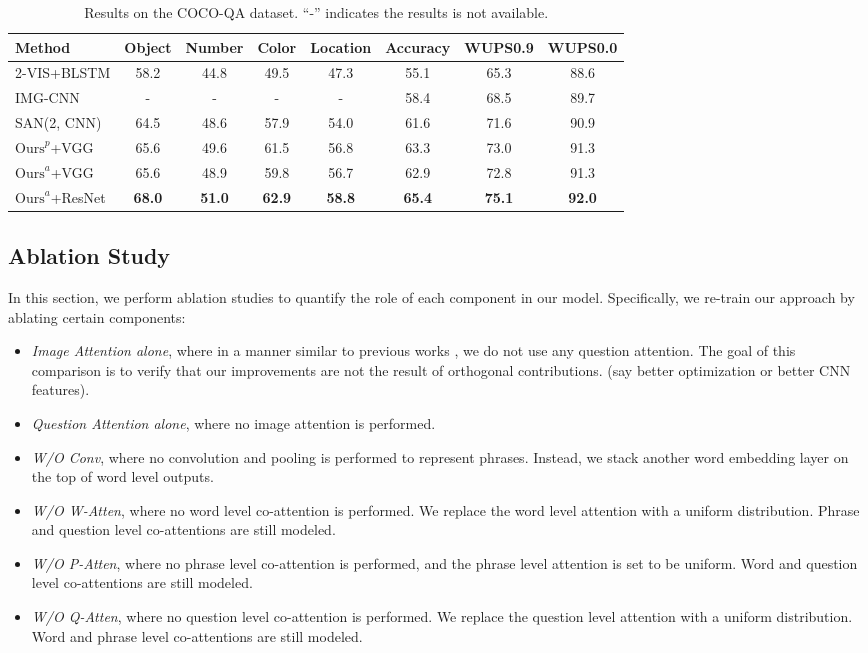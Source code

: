 \documentclass{article}
\begin{document}
\begin{table}[t]\footnotesize
\setlength{\tabcolsep}{5.5pt}
  \caption{Results on the COCO-QA dataset. ``-'' indicates the results is not available.} \label{tab:cocoqa}
  \centering
  \begin{tabular}{l c c c c c c c}
    \toprule
    Method  & Object & Number & Color & Location & Accuracy & WUPS0.9 & WUPS0.0 \\
    \midrule	    
	2-VIS+BLSTM \cite{ren2015exploring} & 58.2 & 44.8 & 49.5 & 47.3 & 55.1 & 65.3 & 88.6\\
	IMG-CNN \cite{ma2015learning} & - & - & - & - & 58.4 &  68.5 &  89.7\\	
	SAN(2, CNN) \cite{yang2015stacked} & 64.5 & 48.6 & 57.9 & 54.0 & 61.6 & 71.6 &  90.9 \\
    \midrule	    	 
	 $\textrm{Ours}^p$+VGG & 65.6 & 49.6 & 61.5 & 56.8 & 63.3 & 73.0 & 91.3\\	
	 $\textrm{Ours}^a$+VGG & 65.6 & 48.9 & 59.8 & 56.7  & 62.9 & 72.8 & 91.3\\
	 $\textrm{Ours}^a$+ResNet & \textbf{68.0} & \textbf{51.0} & \textbf{62.9} & \textbf{58.8} & \textbf{65.4}& \textbf{75.1} & \textbf{92.0} \\
   \bottomrule
  \end{tabular}
\end{table}
\subsection{Ablation Study}
\label{subsec:ablation}
In this section, we perform ablation studies to quantify the role of each component in our model. Specifically, we re-train our approach by ablating certain components:
\begin{itemize}
\item \emph{Image Attention alone}, where in a manner similar to previous works \cite{yang2015stacked}, we do not use any question attention. The goal of this comparison is to verify that our improvements are not the result of orthogonal contributions. (say better optimization or better CNN features). 
\item \emph{Question Attention alone}, where no image attention is performed.
\item \emph{W/O Conv}, where no convolution and pooling is performed to represent phrases. Instead, we stack another word embedding layer on the top of word level outputs. 
\item \emph{W/O W-Atten}, where no word level co-attention is performed. We replace the word level attention with a uniform distribution. Phrase and question level co-attentions are still modeled.
\item \emph{W/O P-Atten}, where no phrase level co-attention is performed, and the phrase level attention is set to be uniform. Word and question level co-attentions are still modeled.
\item \emph{W/O Q-Atten}, where no question level co-attention is performed. We replace the question level attention with a uniform distribution. Word and phrase level co-attentions are still modeled.
\end{itemize}
\end{document}
